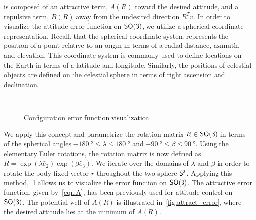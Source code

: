\documentclass[fleqn]{IJCAS}  %
\begin{document}
\begin{multicols}{2}
 is composed of an attractive term, \( A (R) \) toward the desired attitude, and a repulsive term, \( B(R) \) away from the undesired direction \( R^T v \).
In order to visualize the attitude error function on \( \SO \), we utilize a spherical coordinate representation.
Recall, that the spherical coordinate system represents the position of a point relative to an origin in terms of a radial distance, azimuth, and elevation.
This coordinate system is commonly used to define locations on the Earth in terms of a latitude and longitude.
Similarly, the positions of celestial objects are defined on the celestial sphere in terms of right ascension and declination. 
\begin{figure}[H]%
    \centering 
    ~
    \\%
    \caption{Configuration error function visualization}
    \label{fig:config_error} 
\end{figure}%
We apply this concept and parametrize the rotation matrix \( R \in \SO \) in terms of the spherical angles \( \SI{-180}{\degree} \leq \lambda \leq \SI{180}{\degree}  \) and \( \SI{-90}{\degree} \leq \beta \leq \SI{90}{\degree} \). 
Using the elementary Euler rotations, the rotation matrix is now defined as \( R = \exp( \lambda \hat{e}_2) \exp( \beta \hat{e}_3) \).
We iterate over the domains of \( \lambda\) and \(\beta\) in order to rotate the body-fixed vector \( r \) throughout the two-sphere \( \S^2 \).
Applying this method,~\cref{fig:config_error} allows us to visualize the error function on \( \SO \).
The attractive error function, given by~\cref{eqn:A}, has been previously used for attitude control on \(\SO\).
The potential well of \( A(R)\) is illustrated in~\cref{fig:attract_error}, where the desired attitude lies at the minimum of \( A(R) \).


\end{multicols}
\end{document}
